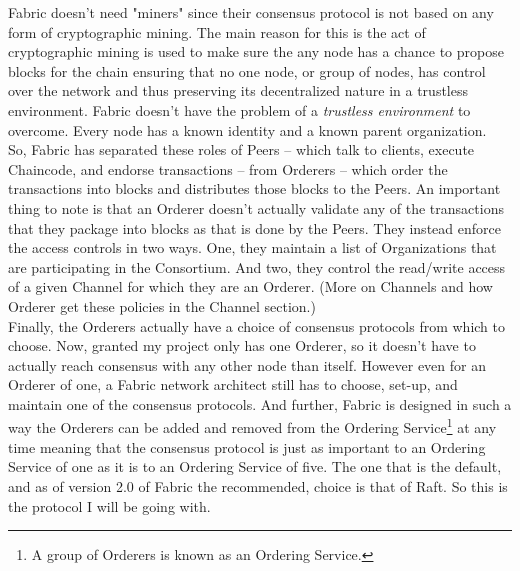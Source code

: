 		\hspace{10mm}Fabric doesn't need "miners" since their consensus protocol is not based on any form of cryptographic mining. The main reason for this is the act of cryptographic mining is used to make sure the any node has a chance to propose blocks for the chain ensuring that no one node, or group of nodes, has control over the network and thus preserving its decentralized nature in a trustless environment. Fabric doesn't have the problem of a \textit{trustless environment} to overcome. Every node has a known identity and a known parent organization.\\
		
		\hspace{10mm}So, Fabric has separated these roles of Peers -- which talk to clients, execute Chaincode, and endorse transactions -- from Orderers -- which order the transactions into blocks and distributes those blocks to the Peers. An important thing to note is that an Orderer doesn't actually validate any of the transactions that they package into blocks as that is done by the Peers. They instead enforce the access controls in two ways. One, they maintain a list of Organizations that are participating in the Consortium. And two, they control the read/write access of a given Channel for which they are an Orderer. (More on Channels and how Orderer get these policies in the Channel section.)\\
		
		\hspace{10mm}Finally, the Orderers actually have a choice of  consensus protocols from which to choose. Now, granted my project only has one Orderer, so it doesn't have to actually reach consensus with any other node than itself. However even for an Orderer of one, a Fabric network architect still has to choose, set-up, and maintain one of the consensus protocols. And further, Fabric is designed in such a way the Orderers can be added and removed from the Ordering Service\footnote{A group of Orderers is known as an Ordering Service.} at any time meaning that the consensus protocol is just as important to an Ordering Service of one as it is to an Ordering Service of five. The one that is the default, and as of version 2.0 of Fabric the recommended, choice is that of Raft. So this is the protocol I will be going with.\\
		
